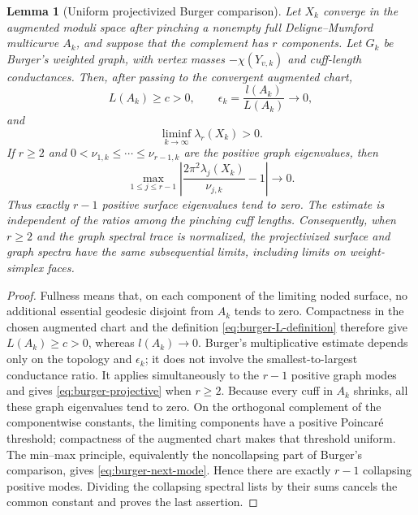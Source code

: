 \documentclass[11pt,reqno]{amsart}
\newtheorem{lemma}[theorem]{Lemma}
\theoremstyle{definition}
\theoremstyle{remark}
\begin{document}
\begin{lemma}[Uniform projectivized Burger comparison]
\label{lem:burger-projective}
Let $X_k$ converge in the augmented moduli space after pinching a nonempty
full Deligne--Mumford multicurve $A_k$, and suppose that the complement has
$r$ components.  Let $G_k$ be Burger's weighted graph, with vertex masses
$-\chi(Y_{v,k})$ and cuff-length conductances.  Then, after passing to the
convergent augmented chart,
\[
 L(A_k)\ge c>0,\qquad \epsilon_k=\frac{l(A_k)}{L(A_k)}\longrightarrow0,
\]
and
\begin{equation}\label{eq:burger-next-mode}
 \liminf_{k\to\infty}\lambda_r(X_k)>0.
\end{equation}
If $r\ge2$ and
$0<\nu_{1,k}\le\cdots\le\nu_{r-1,k}$ are the positive graph eigenvalues,
then
\begin{equation}\label{eq:burger-projective}
 \max_{1\le j\le r-1}
 \left|\frac{2\pi^2\lambda_j(X_k)}{\nu_{j,k}}-1\right|
 \longrightarrow0.
\end{equation}
Thus exactly $r-1$ positive surface eigenvalues tend to zero.  The estimate
is independent of the ratios among the pinching cuff lengths.  Consequently,
when $r\ge2$ and the graph spectral trace is normalized, the projectivized
surface and graph spectra have the same subsequential limits, including
limits on weight-simplex faces.
\end{lemma}

\begin{proof}
Fullness means that, on each component of the limiting noded surface, no
additional essential geodesic disjoint from $A_k$ tends to zero.  Compactness
in the chosen augmented chart and the definition
\eqref{eq:burger-L-definition} therefore give $L(A_k)\ge c>0$, whereas
$l(A_k)\to0$.  Burger's multiplicative estimate
\cite[Theorem~1.1]{Burger1990} depends only on the topology and
$\epsilon_k$; it does not involve the smallest-to-largest conductance ratio.
It applies simultaneously to the $r-1$ positive graph modes and gives
\eqref{eq:burger-projective} when $r\ge2$.  Because every cuff in $A_k$
shrinks, all these graph eigenvalues tend to zero.  On the orthogonal
complement of the componentwise constants, the limiting components have a
positive Poincar\'e threshold; compactness of the augmented chart makes that
threshold uniform.  The min--max principle, equivalently the noncollapsing
part of Burger's comparison, gives \eqref{eq:burger-next-mode}.  Hence there
are exactly $r-1$ collapsing positive modes.  Dividing the collapsing
spectral lists by their sums cancels the common constant and proves the last
assertion.
\end{proof}
\end{document}
